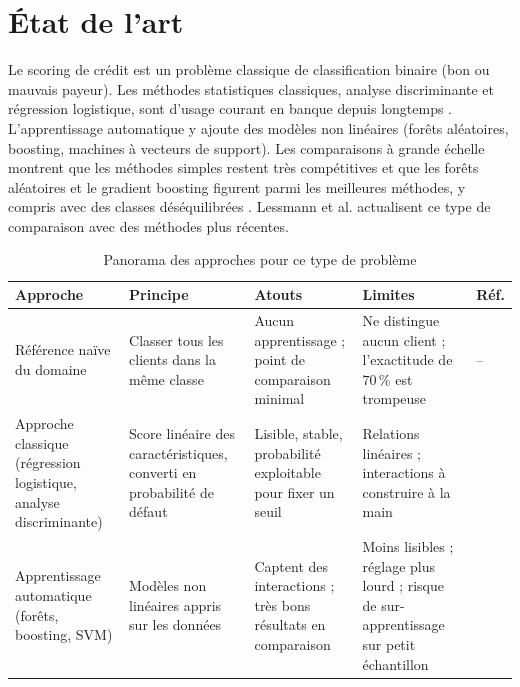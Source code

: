 \documentclass[12pt,a4paper]{article}
\begin{document}
\section{État de l’art}\label{sec:etat}
Le scoring de crédit est un problème classique de classification binaire (bon ou mauvais payeur). Les méthodes statistiques classiques, analyse discriminante et régression logistique, sont d’usage courant en banque depuis longtemps \cite{hand}. L’apprentissage automatique y ajoute des modèles non linéaires (forêts aléatoires, boosting, machines à vecteurs de support). Les comparaisons à grande échelle montrent que les méthodes simples restent très compétitives \cite{baesens} et que les forêts aléatoires et le gradient boosting figurent parmi les meilleures méthodes, y compris avec des classes déséquilibrées \cite{brown}. Lessmann et al. \cite{lessmann} actualisent ce type de comparaison avec des méthodes plus récentes.

\begin{table}[H]
\centering\small
\caption{Panorama des approches pour ce type de problème}
\begin{tabularx}{\linewidth}{@{}p{2.6cm}YYYl@{}}
\toprule
Approche & Principe & Atouts & Limites & Réf. \\
\midrule
Référence naïve du domaine & Classer tous les clients dans la même classe & Aucun apprentissage ; point de comparaison minimal & Ne distingue aucun client ; l’exactitude de $70\,\%$ est trompeuse & -- \\[3pt]
Approche classique (régression logistique, analyse discriminante) & Score linéaire des caractéristiques, converti en probabilité de défaut & Lisible, stable, probabilité exploitable pour fixer un seuil & Relations linéaires ; interactions à construire à la main & \cite{hand,baesens} \\[3pt]
Apprentissage automatique (forêts, boosting, SVM) & Modèles non linéaires appris sur les données & Captent des interactions ; très bons résultats en comparaison & Moins lisibles ; réglage plus lourd ; risque de sur-apprentissage sur petit échantillon & \cite{brown,lessmann} \\
\bottomrule
\end{tabularx}
\end{table}

\end{document}
